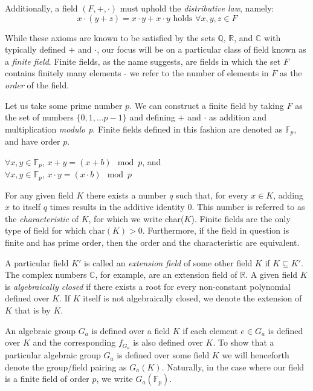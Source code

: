 Additionally, a field $(F,+,\cdot)$ must uphold the \emph{distributive law}, namely:
$$
 x \cdot (y + z) = x \cdot y + x \cdot y \text{ holds } \forall x,y,z \in F
$$

While these axioms are known to be satisfied by the sets $\mathbb{Q}$, $\mathbb{R}$, and $\mathbb{C}$ with typically defined $+$ and $\cdot$, our focus will be on a particular class of field known as a \emph{finite field}. Finite fields, as the name suggests, are fields in which the set $F$ contains finitely many elements - we refer to the number of elements in $F$ as the \emph{order} of the field.

Let us take some prime number $p$. We can construct a finite field by taking $F$ as the set of numbers $\{0, 1, ... p-1\}$ and defining $+$ and $\cdot$ as addition and multiplication \emph{modulo p}. Finite fields defined in this fashion are denoted as $\mathbb{F}_p$, and have order $p$.
\begin{center}
$\forall x,y \in \mathbb{F}_p$, $x + y = (x + b) \mod{p}$, and\\
$\forall x,y \in \mathbb{F}_p$, $x \cdot y = (x \cdot b) \mod{p}$\\
\end{center}

For any given field $K$ there exists a number $q$ such that, for every $x \in K$, adding $x$ to itself $q$ times results in the additive identity 0. This number is referred to as the \emph{characteristic} of $K$, for which we write char($K$). Finite fields are the only type of field for which $\text{char}(K) > 0$. Furthermore, if the field in question is finite and has prime order, then the order and the characteristic are equivalent.

A particular field $K'$ is called an \emph{extension field} of some other field $K$ if $K \subseteq K'$. The complex numbers $\mathbb{C}$, for example, are an extension field of $\mathbb{R}$. A given field $K$ is \emph{algebraically closed} if there exists a root for every non-constant polynomial defined over $K$. If $K$ itself is not algebraically closed, we denote the extension of $K$ that is by $\overline{K}$. 

An algebraic group $G_a$ is defined over a field $K$ if each element $e \in G_a$ is defined over $K$ and the corresponding $f_{G_a}$ is also defined over $K$. To show that a particular algebraic group $G_a$ is defined over some field $K$ we will henceforth denote the group/field pairing as $G_a(K)$. Naturally, in the case where our field is a finite field of order $p$, we write $G_a(\mathbb{F}_p)$.

